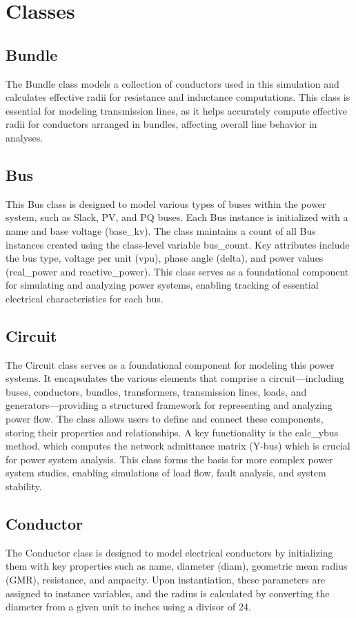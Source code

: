 \documentclass{article}
\begin{document}
	\section{Classes}
	
	\subsection{Bundle}
	The Bundle class models a collection of conductors used in this simulation and calculates effective radii for resistance and inductance computations. This class is essential for modeling transmission lines, as it helps accurately compute effective radii for conductors arranged in bundles, affecting overall line behavior in analyses.
	
	\subsection{Bus}
	This Bus class is designed to model various types of buses within the power system, such as Slack, PV, and PQ buses. Each Bus instance is initialized with a name and base voltage (base\_kv). The class maintains a count of all Bus instances created using the class-level variable bus\_count. Key attributes include the bus type, voltage per unit (vpu), phase angle (delta), and power values (real\_power and reactive\_power). This class serves as a foundational component for simulating and analyzing power systems, enabling tracking of essential electrical characteristics for each bus.
	
	\subsection{Circuit}
	The Circuit class serves as a foundational component for modeling this power systems. It encapsulates the various elements that comprise a circuit—including buses, conductors, bundles, transformers, transmission lines, loads, and generators—providing a structured framework for representing and analyzing power flow. The class allows users to define and connect these components, storing their properties and relationships.  A key functionality is the calc\_ybus method, which computes the network admittance matrix (Y-bus) which is crucial for power system analysis. This class forms the basis for more complex power system studies, enabling simulations of load flow, fault analysis, and system stability.
	
	\subsection{Conductor}
	The Conductor class is designed to model electrical conductors by initializing them with key properties such as name, diameter (diam), geometric mean radius (GMR), resistance, and ampacity. Upon instantiation, these parameters are assigned to instance variables, and the radius is calculated by converting the diameter from a given unit to inches using a divisor of 24.
	
\end{document}
